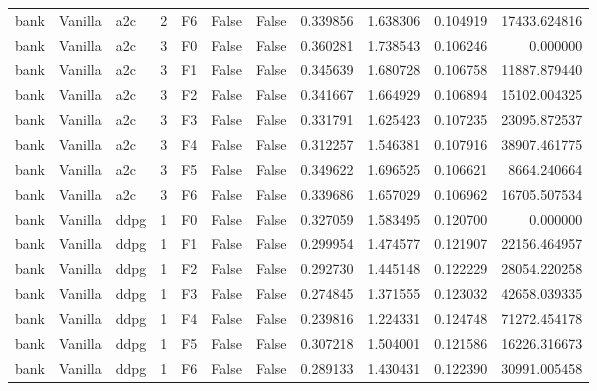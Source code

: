 \begin{tabular}{lllrlllrrrr}
      bank & Vanilla &       a2c &     2 &  F6 &           False &            False &  0.339856 &  1.638306 & 0.104919 &     17433.624816 \\
      bank & Vanilla &       a2c &     3 &  F0 &           False &            False &  0.360281 &  1.738543 & 0.106246 &         0.000000 \\
      bank & Vanilla &       a2c &     3 &  F1 &           False &            False &  0.345639 &  1.680728 & 0.106758 &     11887.879440 \\
      bank & Vanilla &       a2c &     3 &  F2 &           False &            False &  0.341667 &  1.664929 & 0.106894 &     15102.004325 \\
      bank & Vanilla &       a2c &     3 &  F3 &           False &            False &  0.331791 &  1.625423 & 0.107235 &     23095.872537 \\
      bank & Vanilla &       a2c &     3 &  F4 &           False &            False &  0.312257 &  1.546381 & 0.107916 &     38907.461775 \\
      bank & Vanilla &       a2c &     3 &  F5 &           False &            False &  0.349622 &  1.696525 & 0.106621 &      8664.240664 \\
      bank & Vanilla &       a2c &     3 &  F6 &           False &            False &  0.339686 &  1.657029 & 0.106962 &     16705.507534 \\
      bank & Vanilla &      ddpg &     1 &  F0 &           False &            False &  0.327059 &  1.583495 & 0.120700 &         0.000000 \\
      bank & Vanilla &      ddpg &     1 &  F1 &           False &            False &  0.299954 &  1.474577 & 0.121907 &     22156.464957 \\
      bank & Vanilla &      ddpg &     1 &  F2 &           False &            False &  0.292730 &  1.445148 & 0.122229 &     28054.220258 \\
      bank & Vanilla &      ddpg &     1 &  F3 &           False &            False &  0.274845 &  1.371555 & 0.123032 &     42658.039335 \\
      bank & Vanilla &      ddpg &     1 &  F4 &           False &            False &  0.239816 &  1.224331 & 0.124748 &     71272.454178 \\
      bank & Vanilla &      ddpg &     1 &  F5 &           False &            False &  0.307218 &  1.504001 & 0.121586 &     16226.316673 \\
      bank & Vanilla &      ddpg &     1 &  F6 &           False &            False &  0.289133 &  1.430431 & 0.122390 &     30991.005458 \\

\end{tabular}
